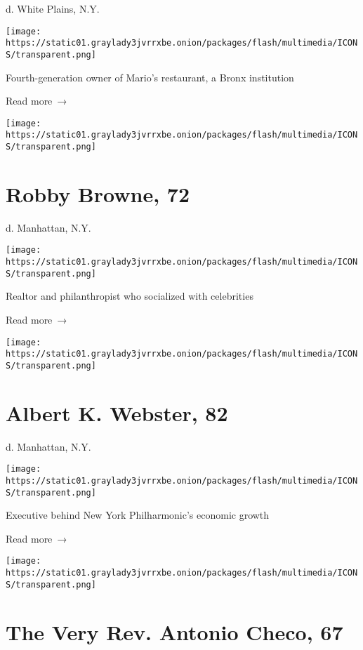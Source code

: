d. White Plains, N.Y.

\texttt{[image: https://static01.graylady3jvrrxbe.onion/packages/flash/multimedia/ICONS/transparent.png]}

Fourth-generation owner of Mario's restaurant, a Bronx institution

 Read more~→

\href{https://www.nytimes3xbfgragh.onion/2020/04/14/realestate/luxury/robby-browne-dead-coronavirus.html}{}

\texttt{[image: https://static01.graylady3jvrrxbe.onion/packages/flash/multimedia/ICONS/transparent.png]}

\hypertarget{robby-browne-72}{%
\section{Robby Browne, 72}\label{robby-browne-72}}

d. Manhattan, N.Y.

\texttt{[image: https://static01.graylady3jvrrxbe.onion/packages/flash/multimedia/ICONS/transparent.png]}

Realtor and philanthropist who socialized with celebrities

 Read more~→

\href{https://www.nytimes3xbfgragh.onion/2020/04/14/obituaries/albert-webster-dead-coronavirus.html}{}

\texttt{[image: https://static01.graylady3jvrrxbe.onion/packages/flash/multimedia/ICONS/transparent.png]}

\hypertarget{albert-k-webster-82}{%
\section{Albert K. Webster, 82}\label{albert-k-webster-82}}

d. Manhattan, N.Y.

\texttt{[image: https://static01.graylady3jvrrxbe.onion/packages/flash/multimedia/ICONS/transparent.png]}

Executive behind New York Philharmonic's economic growth

 Read more~→

\href{https://www.nytimes3xbfgragh.onion/2020/04/14/nyregion/antonio-checo-episcopal-priest-who-stressed-service-dies-at-67.html}{}

\texttt{[image: https://static01.graylady3jvrrxbe.onion/packages/flash/multimedia/ICONS/transparent.png]}

\hypertarget{the-very-rev-antonio-checo-67}{%
\section{The Very Rev. Antonio Checo,
67}\label{the-very-rev-antonio-checo-67}}

